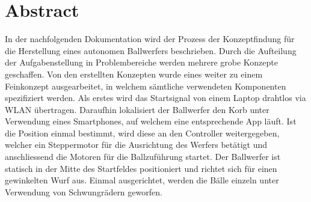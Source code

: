 ﻿\section*{Abstract}
In der nachfolgenden Dokumentation wird der Prozess der Konzeptfindung für die Herstellung eines autonomen Ballwerfers beschrieben. Durch die Aufteilung der Aufgabenstellung in Problembereiche werden mehrere grobe Konzepte geschaffen. Von den erstellten Konzepten wurde eines weiter zu einem Feinkonzept ausgearbeitet, in welchem sämtliche verwendeten Komponenten spezifiziert werden. Als erstes wird das Startsignal von einem Laptop drahtlos via WLAN übertragen. Daraufhin lokalisiert der Ballwerfer den Korb unter Verwendung eines Smartphones, auf welchem eine entsprechende App läuft. Ist die Position einmal bestimmt, wird diese an den Controller weitergegeben, welcher ein Steppermotor für die Ausrichtung des Werfers betätigt und anschliessend die Motoren für die Ballzuführung startet. Der Ballwerfer ist statisch in der Mitte des Startfeldes positioniert und richtet sich für einen gewinkelten Wurf aus. Einmal ausgerichtet, werden die Bälle einzeln unter Verwendung von Schwungrädern geworfen.
